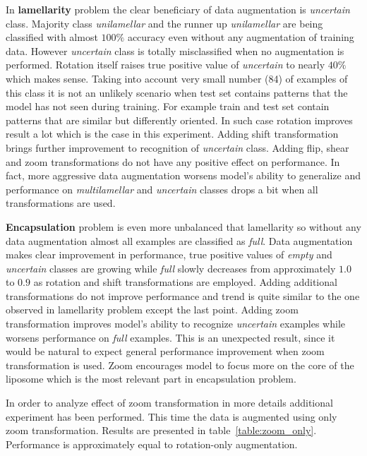 \documentclass[a4paper, 11pt, table]{article}
\begin{document}
In \textbf{lamellarity} problem the clear beneficiary of data augmentation is \textit{uncertain} class. Majority  class \textit{unilamellar} and the runner up \textit{unilamellar} are being classified with almost $100\%$ accuracy even without any augmentation of training data. However \textit{uncertain} class is totally misclassified when no augmentation is performed. Rotation itself raises true positive value of \textit{uncertain} to nearly $40\%$ which makes sense. Taking into account very small number (84) of examples of this class it is not an unlikely scenario when test set contains patterns that the model has not seen during training. For example train and test set contain patterns that are similar but differently oriented. In such case rotation improves result a lot which is the case in this experiment. Adding shift transformation brings further improvement to recognition of \textit{uncertain} class. Adding flip, shear and zoom transformations do not have any positive effect on performance. In fact, more aggressive data augmentation worsens model's ability to generalize and performance on \textit{multilamellar} and \textit{uncertain} classes drops a bit when all transformations are used.

\textbf{Encapsulation} problem is even more unbalanced that lamellarity so without any data augmentation almost all examples are classified as \textit{full}. Data augmentation makes clear improvement in performance, true positive values of \textit{empty} and \textit{uncertain} classes are growing while \textit{full} slowly decreases from approximately $1.0$ to $0.9$ as rotation and shift transformations are employed. Adding additional transformations do not improve performance and trend is quite similar to the one observed in lamellarity problem except the last point. Adding zoom transformation improves model's ability to recognize \textit{uncertain} examples while worsens performance on \textit{full} examples. This is an unexpected result, since it would be natural to expect general performance improvement when zoom transformation is used. Zoom encourages model to focus more on the core of the liposome which is the most relevant part in encapsulation problem.

In order to analyze effect of zoom transformation in more details additional experiment has been performed. This time the data is augmented using only zoom transformation. Results are presented in table~\ref{table:zoom_only}. Performance is approximately equal to rotation-only augmentation. 
\end{document}

